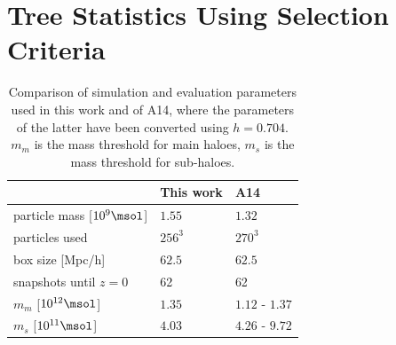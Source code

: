 \section{Tree Statistics Using \citet{SUSSING_HALOFINDER} Selection Criteria}\label{chap:performance_comparison}



\begin{table}
\centering
\caption{
	Comparison of simulation and evaluation parameters used in this work and of A14, where the parameters of the latter have been converted using $h = 0.704$.
	$m_m$ is the mass threshold for main haloes, $m_s$ is the mass threshold for sub-haloes.
	\label{tab:parameter-comparison}
}
	\begin{tabular}[c]{l l l}
																	&	This work		&	A14 \\
		\hline
		particle mass	[$10^9 \msol$]	&	$1.55$			& $1.32$						\\
		particles used								& $256^3$			& $270^3$ 					\\
		box size [Mpc/h]							& $62.5$			& $62.5$						\\
		snapshots until $z = 0$				& 62					& 62								\\
		$m_m$ [$10^{12} \msol$]				&	$1.35$			& $1.12$ - $1.37$		\\
		$m_s$ [$10^{11} \msol$]				&	$4.03$			& $4.26$ - $9.72$		\\
		\hline
	\end{tabular}
\end{table}


